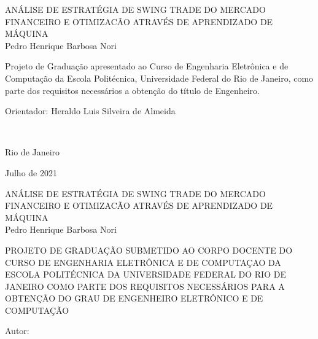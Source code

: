 
\begin{center}
\large{AN\'ALISE DE ESTRAT\'EGIA DE SWING TRADE DO MERCADO FINANCEIRO E OTIMIZAC\~AO ATRAV\'ES DE APRENDIZADO DE M\'AQUINA}\\
   \vspace{2cm}
\large{Pedro Henrique Barbosa Nori}\\
\end{center}
   \vspace{3cm}
\hspace{7cm}
\hfill \parbox{8.0cm}{Projeto de Gradua\c{c}\~ao apresentado ao Curso de Engenharia Eletr\^onica e de Computa\c{c}\~ao da Escola Polit\'ecnica, Universidade Federal do Rio de Janeiro, como parte dos requisitos necess\'arios a obten\c{c}\~ao do t\'itulo de Engenheiro.\\}
   \vspace{2cm}
\hfill \parbox{8.0cm}{Orientador: Heraldo Luis Silveira de Almeida} \\
   \vspace{2cm}
\begin{center}
Rio de Janeiro

Julho de 2021
\end{center}




\pagebreak


\begin{center}
   \large{AN\'ALISE DE ESTRAT\'EGIA DE SWING TRADE DO MERCADO FINANCEIRO E OTIMIZAC\~AO ATRAV\'ES DE APRENDIZADO DE M\'AQUINA}\\
   \vspace{1cm}
\large{Pedro Henrique Barbosa Nori}\\
\end{center}
   \vspace{2cm}
PROJETO DE GRADUA\c{C}\~AO SUBMETIDO AO CORPO DOCENTE DO CURSO DE ENGENHARIA ELETR\^ONICA E DE COMPUTA\c{C}AO DA ESCOLA POLIT\'ECNICA DA UNIVERSIDADE FEDERAL DO RIO DE JANEIRO COMO PARTE DOS REQUISITOS NECESS\'ARIOS PARA A OBTEN\c{C}\~AO DO GRAU DE ENGENHEIRO ELETR\^ONICO E DE COMPUTA\c{C}\~AO

   \vspace{1cm}
Autor:
      \vspace{0.5cm}
      \begin{flushright}
         \parbox{10cm}{
            \hrulefill

            \vspace{-.375cm}

            \vspace{0.1cm}
         }
      \end{flushright}


